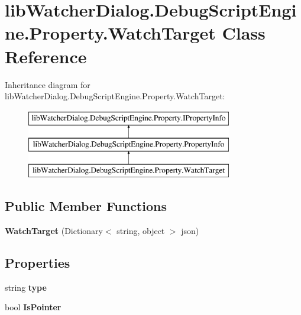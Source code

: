 \hypertarget{classlib_watcher_dialog_1_1_debug_script_engine_1_1_property_1_1_watch_target}{\section{lib\+Watcher\+Dialog.\+Debug\+Script\+Engine.\+Property.\+Watch\+Target Class Reference}
\label{classlib_watcher_dialog_1_1_debug_script_engine_1_1_property_1_1_watch_target}
}
Inheritance diagram for lib\+Watcher\+Dialog.\+Debug\+Script\+Engine.\+Property.\+Watch\+Target\+:\begin{figure}[H]
\begin{center}
\leavevmode
\includegraphics[height=3.000000cm]{classlib_watcher_dialog_1_1_debug_script_engine_1_1_property_1_1_watch_target}
\end{center}
\end{figure}
\subsection*{Public Member Functions}
\begin{DoxyCompactItemize}
\item 
\hypertarget{classlib_watcher_dialog_1_1_debug_script_engine_1_1_property_1_1_watch_target_a3dc082c19312478a191e162477023f96}{{\bfseries Watch\+Target} (Dictionary$<$ string, object $>$ json)}\label{classlib_watcher_dialog_1_1_debug_script_engine_1_1_property_1_1_watch_target_a3dc082c19312478a191e162477023f96}

\end{DoxyCompactItemize}
\subsection*{Properties}
\begin{DoxyCompactItemize}
\item 
\hypertarget{classlib_watcher_dialog_1_1_debug_script_engine_1_1_property_1_1_watch_target_a2fe0cc82621d18fccc6c123561102f20}{string {\bfseries type}}\label{classlib_watcher_dialog_1_1_debug_script_engine_1_1_property_1_1_watch_target_a2fe0cc82621d18fccc6c123561102f20}

\item 
\hypertarget{classlib_watcher_dialog_1_1_debug_script_engine_1_1_property_1_1_watch_target_a38668db63987798fdc56abc253f003f6}{bool {\bfseries Is\+Pointer}}\label{classlib_watcher_dialog_1_1_debug_script_engine_1_1_property_1_1_watch_target_a38668db63987798fdc56abc253f003f6}

\end{DoxyCompactItemize}
